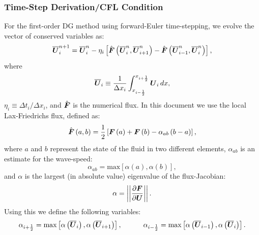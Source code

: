 \subsubsection{Time-Step Derivation/CFL Condition}
For the first-order DG method using forward-Euler time-stepping, we evolve the vector of conserved variables as:
\begin{equation}\label{Eq:1stOrderDG}
    \overline{\boldsymbol{U}}^{n+1}_{i}=\overline{\boldsymbol{U}}^{n}_{i}-\eta_{i}\left[\hat{\boldsymbol{F}}\left(\overline{\boldsymbol{U}}^{n}_{i},\overline{\boldsymbol{U}}^{n}_{i+1}\right)-\hat{\boldsymbol{F}}\left(\overline{\boldsymbol{U}}^{n}_{i-1},\overline{\boldsymbol{U}}^{n}_{i}\right)\right],
\end{equation}
where
\begin{equation}
    \overline{\boldsymbol{U}}_{i}\equiv\frac{1}{\Delta x_{i}}\int_{x_{i-\frac{1}{2}}}^{x_{i+\frac{1}{2}}}\boldsymbol{U}_{i}\,dx,
\end{equation}
$\eta_{i}\equiv\Delta t_{i}/\Delta x_{i}$, and $\hat{\boldsymbol{F}}$ is the numerical flux. In this document we use the local Lax-Friedrichs flux, defined as:
\begin{equation}\label{Eq:LLF}
    \hat{\boldsymbol{F}}\left(a,b\right)=\frac{1}{2}\left[\boldsymbol{F}\left(a\right)+\boldsymbol{F}\left(b\right) - \alpha_{ab}\left(b-a\right)\right],
\end{equation}
where $a$ and $b$ represent the state of the fluid in two different elements, $\alpha_{ab}$ is an estimate for the wave-speed:
\begin{equation}
    \alpha_{ab}=\text{max}\left[\alpha\left(a\right),\alpha\left(b\right)\right],
\end{equation}
and $\alpha$ is the largest (in absolute value) eigenvalue of the flux-Jacobian:
\begin{equation}
    \alpha=\left|\left|\frac{\partial \boldsymbol{F}}{\partial \boldsymbol{U}}\right|\right|.
\end{equation}
Using this we define the following variables:
\begin{equation}\label{Eq:EigVals}
    \alpha_{i+\frac{1}{2}}=\text{max}\left[\alpha\left(\overline{\boldsymbol{U}}_{i}\right),\alpha\left(\overline{\boldsymbol{U}}_{i+1}\right)\right],\hspace{3em} \alpha_{i-\frac{1}{2}}=\text{max}\left[\alpha\left(\overline{\boldsymbol{U}}_{i-1}\right),\alpha\left(\overline{\boldsymbol{U}}_{i}\right)\right].
\end{equation}

